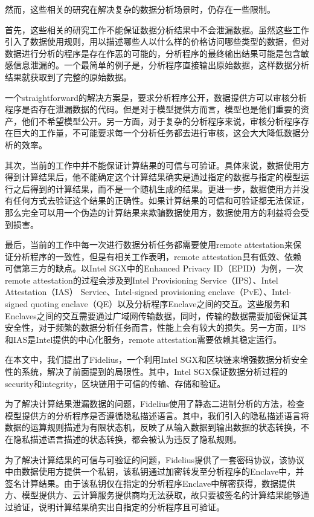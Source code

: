 然而，这些相关的研究在解决复杂的数据分析场景时，仍存在一些限制。

首先，这些相关的研究工作不能保证数据分析结果中不会泄漏数据。虽然这些工作引入了数据使用规则，用以描述哪些人以什么样的价格访问哪些类型的数据，但对数据进行分析的程序是存在作恶的可能的，分析程序的最终输出结果可能是包含敏感信息泄漏的。一个最简单的例子是，分析程序直接输出原始数据，这样数据分析结果就获取到了完整的原始数据。

一个straightforward的解决方案是，要求分析程序公开，数据提供方可以审核分析程序是否存在泄漏数据的代码。但是对于模型提供方而言，模型也是他们重要的资产，他们不希望模型公开。另一方面，对于复杂的分析程序来说，审核分析程序存在巨大的工作量，不可能要求每一个分析任务都去进行审核，这会大大降低数据分析的效率。

其次，当前的工作中并不能保证计算结果的可信与可验证。具体来说，数据使用方得到计算结果后，他不能确定这个计算结果确实是通过指定的数据与指定的模型运行之后得到的计算结果，而不是一个随机生成的结果。更进一步，数据使用方并没有任何方式去验证这个结果的正确性。如果计算结果的可信和可验证都无法保证，那么完全可以用一个伪造的计算结果来欺骗数据使用方，数据使用方的利益将会受到损害。

最后，当前的工作中每一次进行数据分析任务都需要使用remote attestation来保证分析程序的一致性，但是有相关工作表明，remote attestation具有低效、依赖可信第三方的缺点。以Intel SGX中的Enhanced Privacy ID（EPID）为例，一次remote attestation的过程会涉及到Intel Provisioning Service（IPS）、Intel Attestation（IAS） Service、Intel-signed provisioning enclave（PvE）、Intel-signed quoting enclave（QE）以及分析程序Enclave之间的交互。这些服务和Enclaves之间的交互需要通过广域网传输数据，同时，传输的数据需要加密保证其安全性，对于频繁的数据分析任务而言，性能上会有较大的损失。另一方面，IPS和IAS是Intel提供的中心化服务，remote attestation需要依赖其稳定运行。

在本文中，我们提出了Fidelius，一个利用Intel SGX和区块链来增强数据分析安全性的系统，解决了前面提到的局限性。其中，Intel SGX保证数据分析过程的security和integrity，区块链用于可信的传输、存储和验证。

为了解决计算结果泄漏数据的问题，Fidelius使用了静态二进制分析的方法，检查模型提供方的分析程序是否遵循隐私描述语言。其中，我们引入的隐私描述语言将数据的运算规则描述为有限状态机，反映了从输入数据到输出数据的状态转换，不在隐私描述语言描述的状态转换，都会被认为违反了隐私规则。

为了解决计算结果的可信与可验证的问题，Fidelius提供了一套密码协议，该协议中由数据使用方提供一个私钥，该私钥通过加密转发至分析程序的Enclave中，并签名计算结果。由于该私钥仅在指定的分析程序Enclave中解密获得，数据提供方、模型提供方、云计算服务提供商均无法获取，故只要被签名的计算结果能够通过验证，说明计算结果确实出自指定的分析程序且可验证。

